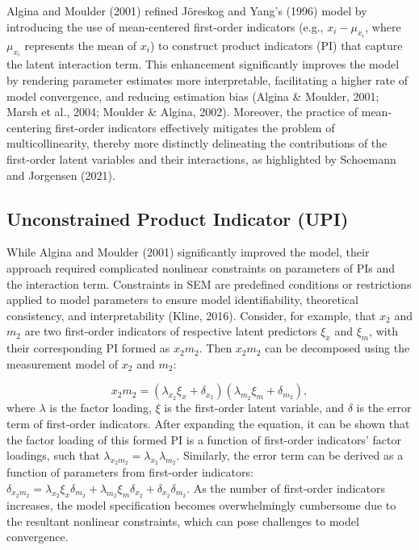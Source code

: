 \documentclass[
  man]{apa6}
\begin{document}
Algina and Moulder (2001) refined Jöreskog and Yang's (1996) model by introducing the use of mean-centered first-order indicators (e.g., \(x_{i} - \mu_{x_{i}}\), where \(\mu_{x_{i}}\) represents the mean of \(x_{i}\)) to construct product indicators (PI) that capture the latent interaction term. This enhancement significantly improves the model by rendering parameter estimates more interpretable, facilitating a higher rate of model convergence, and reducing estimation bias (Algina \& Moulder, 2001; Marsh et al., 2004; Moulder \& Algina, 2002). Moreover, the practice of mean-centering first-order indicators effectively mitigates the problem of multicollinearity, thereby more distinctly delineating the contributions of the first-order latent variables and their interactions, as highlighted by Schoemann and Jorgensen (2021).

\subsection{Unconstrained Product Indicator (UPI)}\label{unconstrained-product-indicator-upi}

While Algina and Moulder (2001) significantly improved the model, their approach required complicated nonlinear constraints on parameters of PIs and the interaction term. Constraints in SEM are predefined conditions or restrictions applied to model parameters to ensure model identifiability, theoretical consistency, and interpretability (Kline, 2016). Consider, for example, that \(x_{2}\) and \(m_{2}\) are two first-order indicators of respective latent predictors \(\xi_{x}\) and \(\xi_{m}\), with their corresponding PI formed as \(x_{2}m_{2}\). Then \(x_{2}m_{2}\) can be decomposed using the measurement model of \(x_{2}\) and \(m_{2}\):

\begin{equation}
x_{2}m_{2}= (\lambda_{x_{2}}\xi_{x} + \delta_{x_{2}})(\lambda_{m_{2}}\xi_{m} + \delta_{m_{2}}),
\end{equation}
where \(\lambda\) is the factor loading, \(\xi\) is the first-order latent variable, and \(\delta\) is the error term of first-order indicators. After expanding the equation, it can be shown that the factor loading of this formed PI is a function of first-order indicators' factor loadings, such that \(\lambda_{x_{2}m_{2}} = \lambda_{x_{2}}\lambda_{m_{2}}\). Similarly, the error term can be derived as a function of parameters from first-order indicators: \(\delta_{x_{2}m_{2}} = \lambda_{x_{2}}\xi_{x}\delta_{m_{2}} + \lambda_{m_{2}}\xi_{m}\delta_{x_{2}} + \delta_{x_{2}}\delta_{m_{2}}\). As the number of first-order indicators increases, the model specification becomes overwhelmingly cumbersome due to the resultant nonlinear constraints, which can pose challenges to model convergence.
\end{document}
